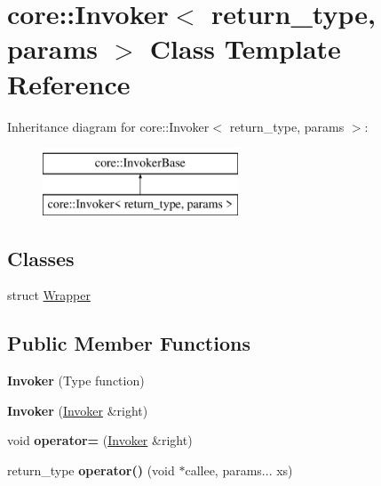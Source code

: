 \hypertarget{classcore_1_1_invoker}{}\section{core\+:\+:Invoker$<$ return\+\_\+type, params $>$ Class Template Reference}
\label{classcore_1_1_invoker}
Inheritance diagram for core\+:\+:Invoker$<$ return\+\_\+type, params $>$\+:\begin{figure}[H]
\begin{center}
\leavevmode
\includegraphics[height=2.000000cm]{d3/dca/classcore_1_1_invoker}
\end{center}
\end{figure}
\subsection*{Classes}
\begin{DoxyCompactItemize}
\item 
struct \hyperlink{structcore_1_1_invoker_1_1_wrapper}{Wrapper}
\end{DoxyCompactItemize}
\subsection*{Public Member Functions}
\begin{DoxyCompactItemize}
\item 
\mbox{\label{classcore_1_1_invoker_a7a061acd788cce09e236b5d88c81539d}} 
{\bfseries Invoker} (Type function)
\item 
\mbox{\label{classcore_1_1_invoker_af11a95ae72d36ca19d104211ebd9b14b}} 
{\bfseries Invoker} (\hyperlink{classcore_1_1_invoker}{Invoker} \&right)
\item 
\mbox{\label{classcore_1_1_invoker_a6c299259795abe41fffe3af74d1189a3}} 
void {\bfseries operator=} (\hyperlink{classcore_1_1_invoker}{Invoker} \&right)
\item 
\mbox{\label{classcore_1_1_invoker_a77880ac54daebaf9c7845b51decc3de6}} 
return\+\_\+type {\bfseries operator()} (void $\ast$callee, params... xs)
\end{DoxyCompactItemize}
